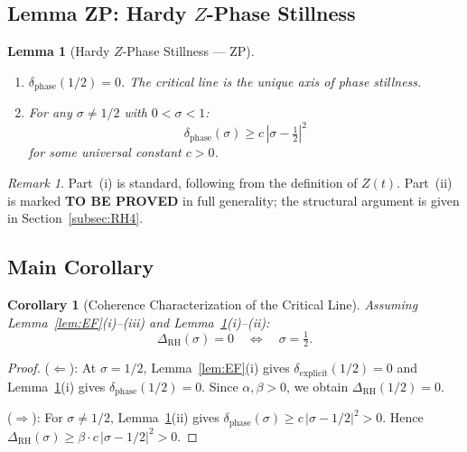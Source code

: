 \documentclass[11pt]{article}
\newtheorem{lemma}[theorem]{Lemma}
\newtheorem{corollary}[theorem]{Corollary}
\theoremstyle{remark}
\newtheorem{remark}[theorem]{Remark}
\begin{document}
\subsection{Lemma ZP: Hardy $Z$-Phase Stillness}

\begin{lemma}[Hardy $Z$-Phase Stillness --- ZP]
\label{lem:ZP}
\hfill
\begin{enumerate}
  \item[(i)] $\delta_{\mathrm{phase}}(1/2)=0$.
    The critical line is the unique axis of phase stillness.
  \item[(ii)] For any $\sigma\neq 1/2$ with $0<\sigma<1$:
    \begin{equation}\label{eq:phase-lower}
      \delta_{\mathrm{phase}}(\sigma) \geq c\,|\sigma-\tfrac{1}{2}|^2
    \end{equation}
    for some universal constant $c>0$.
\end{enumerate}
\end{lemma}

\begin{remark}
Part~(i) is standard, following from the definition of $Z(t)$.
Part~(ii) is marked \textbf{TO BE PROVED} in full generality; the structural argument
is given in Section~\ref{subsec:RH4}.
\end{remark}

\subsection{Main Corollary}

\begin{corollary}[Coherence Characterization of the Critical Line]
\label{cor:RH}
Assuming Lemma~\ref{lem:EF}(i)--(iii) and Lemma~\ref{lem:ZP}(i)--(ii):
\begin{equation}\label{eq:corollary}
  \Delta_{\mathrm{RH}}(\sigma)=0 \quad\Longleftrightarrow\quad \sigma=\tfrac{1}{2}.
\end{equation}
\end{corollary}

\begin{proof}
($\Leftarrow$): At $\sigma=1/2$, Lemma~\ref{lem:EF}(i) gives
$\delta_{\mathrm{explicit}}(1/2)=0$ and Lemma~\ref{lem:ZP}(i) gives
$\delta_{\mathrm{phase}}(1/2)=0$.
Since $\alpha,\beta>0$, we obtain $\Delta_{\mathrm{RH}}(1/2)=0$.

($\Rightarrow$): For $\sigma\neq 1/2$, Lemma~\ref{lem:ZP}(ii) gives
$\delta_{\mathrm{phase}}(\sigma)\geq c\,|\sigma-1/2|^2>0$.
Hence $\Delta_{\mathrm{RH}}(\sigma)\geq \beta\cdot c\,|\sigma-1/2|^2>0$.
\end{proof}
\end{document}

